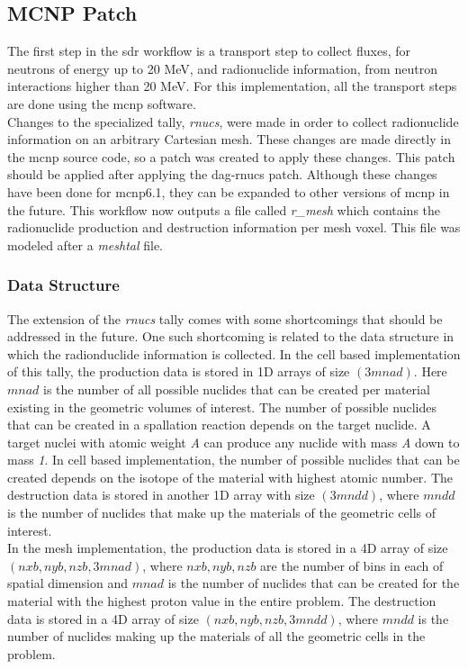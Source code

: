 \subsection{MCNP Patch}
The first step in the \gls{sdr} workflow is a transport step to collect
fluxes, for neutrons of energy up to 20 MeV, and radionuclide information, from
neutron interactions higher than 20 MeV. For this implementation, all the
transport steps are done using the \gls{mcnp} software.\\
Changes to the specialized tally, \textit{rnucs}, were made in
order to collect radionuclide information on an arbitrary Cartesian mesh. These
changes are made directly in the \gls{mcnp} source code, so a patch was created
to apply these changes. This patch should be applied after applying the
\gls{dag}-rnucs patch. Although these changes have been done for \gls{mcnp}6.1,
they can be expanded to other versions of \gls{mcnp} in the future.
This workflow now outputs a file called \textit{r\_mesh} which contains the
radionuclide production and destruction information per mesh voxel. This file
was modeled after a \textit{meshtal} file.
%
\subsubsection{Data Structure}
The extension of the \textit{rnucs} tally comes  with some shortcomings that
should be addressed in the future. One such shortcoming is related to the data
structure in which the radionduclide information is collected. In the cell
based implementation of this tally, the production data is stored in 1D arrays
of size $(3mnad)$. Here $mnad$ is the number of all possible nuclides that can
be created per material existing in the geometric volumes of interest.
The number of possible nuclides that can be created in a spallation reaction
depends on the target nuclide. A target nuclei with atomic weight \emph{A}
can produce any nuclide with mass \emph{A} down to mass \emph{1}. In cell
based implementation, the number of possible nuclides that can be created
depends on the isotope of the material with highest atomic number.
The destruction data is stored in another 1D array with size $(3mndd)$, where
$mndd$ is the number of nuclides that make up the materials of the geometric
cells of interest.\\
In the mesh implementation, the production data is stored in a 4D array
of size $(nxb,nyb,nzb,3mnad)$, where $nxb, nyb, nzb$ are the number of bins in
each of spatial dimension and $mnad$ is the number of nuclides that can be
created for the material with the highest proton value in the entire problem.
The destruction data is stored in a 4D array of size $(nxb,nyb,nzb,3mndd)$,
where $mndd$ is the number of nuclides making up the materials of all the
geometric cells in the problem.
%
